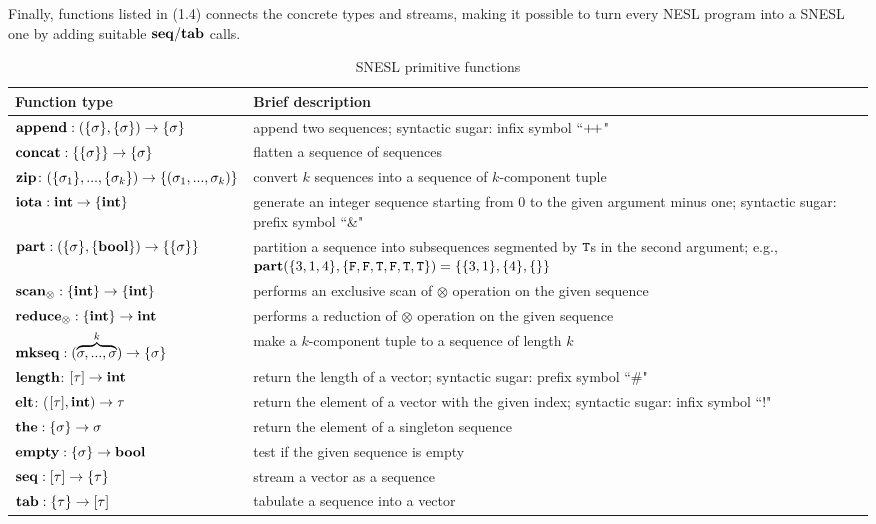 Finally, functions listed in (1.4) connects the concrete types and streams, making it possible to turn every NESL program into a SNESL one by adding suitable $\mathbf{seq}/\mathbf{tab}$ calls.

\begin{table}\large
	\renewcommand\arraystretch{1.8}
	\centering
	\begin{tabular}{|p{}|p{}|}
		\hline
		Function type & Brief description  \\ \hline
		$\mathbf{append : (\{\sigma\}, \{\sigma\}) \rightarrow \{\sigma\}}$ & append two sequences; syntactic sugar: infix symbol ``${\++}$" \\ \hline
		$\mathbf{concat: \{\{\sigma\}\} \rightarrow \{\sigma\} }$ &  flatten a sequence of sequences                 \\ \hline
		$\mathbf{zip} \colon (\{\sigma_1\}, ..., \{\sigma_k\})\rightarrow \{(\sigma_1,...,\sigma_k)\}$ & convert $k$ sequences into a sequence of $k$-component tuple \\ \hline
		$\mathbf{iota: \mathbf{int} \rightarrow \{\mathbf{int}\}}$  &  generate an integer sequence starting from 0 to the given argument minus one; syntactic sugar: prefix symbol ``\&"    \\ \hline
		$\mathbf{part: (\{\sigma\}, \{\mathbf{bool}\}) \rightarrow  \{\{\sigma\}\}}$   & partition a sequence into subsequences segmented by $\mathtt{T}$s in the second argument; e.g., $\mathbf{part}(\{3,1,4\}, \{\mathtt{F},\mathtt{F},\mathtt{T},\mathtt{F},\mathtt{T},\mathtt{T}\}) = \{\{3,1\},\{4\},\{\}\}$                \\ \hline
		$\mathbf{scan_\otimes}: \{\mathbf{int}\} \rightarrow \{\mathbf{int}\}$     &  performs an exclusive scan of $\otimes$ operation on the given sequence    \\ \hline
		$\mathbf{reduce_\otimes: \{\mathbf{int}\} \rightarrow \mathbf{int} }$     &   performs a reduction of $\otimes$ operation on the given sequence             \\ \hline
		$\mathbf{mkseq}: (\overbrace{\sigma,...,\sigma}^{k}) \rightarrow \{\sigma\}$  & make a $k$-component tuple to a sequence of length $k$ \\ \hline  
	    $\mathbf{length}$: $[\tau] \rightarrow \mathbf{int}$ & return the length of a vector; syntactic sugar: prefix symbol ``\#" \\ \hline  
	    $\mathbf{elt}$: ($[\tau], \mathbf{int}) \rightarrow \tau$  & return the  element of a vector with the given index; syntactic sugar: infix symbol ``!" \\ \hline  
	    $\mathbf{the:  \{\sigma\} \rightarrow \sigma}$     &     return the element of a singleton sequence           \\ \hline
	    $\mathbf{empty:  \{\sigma\} \rightarrow \mathbf{bool}}$       & test if the given sequence is empty            \\ \hline  
	    $\mathbf{seq}: [\tau] \rightarrow \{\tau\} $  & stream a vector as a sequence \\ \hline  
	    $\mathbf{tab}: \{\tau\} \rightarrow [\tau] $  & tabulate a sequence into a vector\\ \hline  
	\end{tabular}
	\caption{SNESL primitive functions}
	\label{tab:snesl-funcs}
\end{table}




